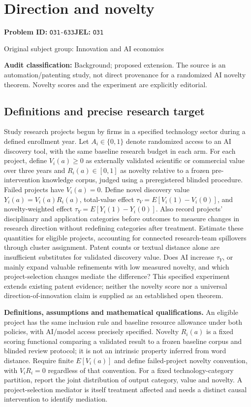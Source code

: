 \documentclass[11pt,a4paper]{article}
\begin{document}
\section*{Direction and novelty}
\textbf{Problem ID:} \texttt{O31-633}\quad \textbf{JEL:} \texttt{O31}\par
\label{problem:OP-0419}
{\sffamily\small\color{muted}Original subject group: Innovation and AI economics\par}
\label{definitions:problem:30007701}
\textbf{Audit classification:} Background; proposed extension. The source is an automation/patenting study, not direct provenance for a randomized AI novelty theorem. Novelty scores and the experiment are explicitly editorial.
\subsection*{Definitions and precise research target}
Study research projects begun by firms in a specified technology sector during a defined enrollment year. Let \(A_i\in\{0,1\}\) denote randomized access to an AI discovery tool, with the same baseline research budget in each arm. For each project, define \(V_i(a)\geq0\) as externally validated scientific or commercial value over three years and \(R_i(a)\in[0,1]\) as novelty relative to a frozen pre-intervention knowledge corpus, judged using a preregistered blinded procedure. Failed projects have \(V_i(a)=0\). Define novel discovery value \(Y_i(a)=V_i(a)R_i(a)\), total-value effect \(\tau_V=E[V_i(1)-V_i(0)]\), and novelty-weighted effect \(\tau_Y=E[Y_i(1)-Y_i(0)]\). Also record projects' disciplinary and application categories before outcomes to measure changes in research direction without redefining categories after treatment. Estimate these quantities for eligible projects, accounting for connected research-team spillovers through cluster assignment. Patent counts or textual distance alone are insufficient substitutes for validated discovery value. Does AI increase \(\tau_Y\), or mainly expand valuable refinements with low measured novelty, and which project-selection changes mediate the difference? This specified experiment extends existing patent evidence; neither the novelty score nor a universal direction-of-innovation claim is supplied as an established open theorem.

\textbf{Definitions, assumptions and mathematical qualifications.} An eligible project has the same inclusion rule and baseline resource allowance under both policies, with AI/model access precisely specified. Novelty \(R_i(a)\) is a fixed scoring functional comparing a validated result to a frozen baseline corpus and blinded review protocol; it is not an intrinsic property inferred from word distance. Require finite \(E[V_i(a)]\) and define failed-project novelty convention, with \(V_iR_i=0\) regardless of that convention. For a fixed technology-category partition, report the joint distribution of output category, value and novelty. A project-selection mediator is itself treatment affected and needs a distinct causal intervention to identify mediation.
\end{document}
